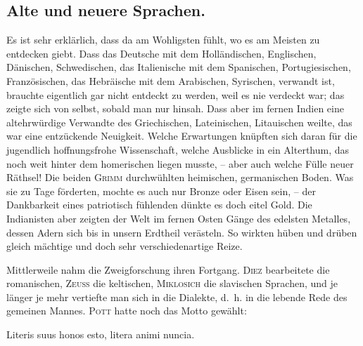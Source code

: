 {\subsection*{Alte und neuere Sprachen.}
\begin{sloppypar}Es ist sehr erklärlich, dass  da am Wohligsten fühlt, wo es am Meisten zu entdecken giebt. Dass das Deutsche mit dem Holländischen, \label{sp.173} Englischen, Dänischen, Schwedischen, das Italienische mit dem Spanischen, Portugiesischen, Französischen, das Hebräische mit dem Arabischen, Syrischen,  verwandt ist, brauchte eigentlich gar nicht entdeckt zu werden, weil es nie verdeckt war; das zeigte sich von selbst, sobald man nur hinsah. Dass aber im fernen Indien eine altehrwürdige Verwandte des Griechischen, Lateinischen,  Litauischen weilte, das war eine entzückende Neuigkeit. Welche Erwartungen knüpften sich daran für die jugendlich hoffnungsfrohe Wissenschaft, welche Ausblicke in ein Alterthum, das noch weit hinter dem homerischen liegen musste, – aber auch welche Fülle neuer Räthsel! Die beiden \textsc{Grimm} durchwühlten heimischen, germanischen Boden. Was sie zu Tage förderten, mochte es auch nur Bronze oder Eisen sein, – der Dankbarkeit eines patriotisch fühlenden  dünkte es doch eitel Gold. Die Indianisten aber zeigten der Welt im fernen Osten  Gänge des edelsten Metalles, dessen Adern sich bis in unsern Erdtheil verästeln. So wirkten hüben und drüben gleich mächtige und doch sehr verschiedenartige Reize. \end{sloppypar}

Mittlerweile nahm die Zweigforschung ihren Fortgang. \textsc{Diez} bearbeitete die romanischen, \textsc{Zeuss} die keltischen, \textsc{Miklosich} die slavischen Sprachen, und je länger je mehr vertiefte man sich in die Dialekte, d.~h. in die lebende Rede des gemeinen Mannes. \textsc{Pott} hatte noch das Motto gewählt:

Literis suus honos esto, litera animi nuncia.

}
